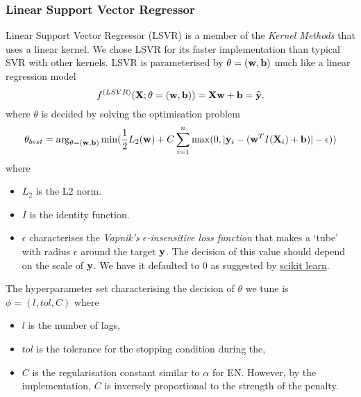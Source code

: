 \subsubsection{Linear Support Vector Regressor}
Linear Support Vector Regressor (LSVR) is a member of the \textit{Kernel Methods} that uses a linear kernel. We chose LSVR for its faster implementation than typical SVR with other kernels. LSVR is parameterised by $\theta = (\mathbf{w}, \mathbf{b})$ much like a linear regression model
\begin{equation*}
    f^{(LSVR)} (\mathbf{X} ; \theta = (\mathbf{w}, \mathbf{b})) = \mathbf{X} \mathbf{w} + \mathbf{b} = \widehat{\mathbf{y}}.
\end{equation*}
where $\theta$ is decided by solving the optimisation problem
\begin{equation*}
    \theta_{best} = \arg_{\theta = (\mathbf{w}, \mathbf{b})} \min (\frac{1}{2} L_2(\mathbf{w}) + C \sum_{i=1}^{n} \max(0, |\mathbf{y}_i - (\mathbf{w}^T I(\mathbf{X}_i) + \mathbf{b})| - \epsilon))
\end{equation*}
where
\begin{itemize}
    \item $L_2$ is the L2 norm.
    \item $I$ is the identity function.
    \item $\epsilon$ characterises the \textit{Vapnik's $\epsilon$-insensitive loss function} that makes a `tube' with radius $\epsilon$ around the target $\mathbf{y}$. The decision of this value should depend on the scale of $\mathbf{y}$. We have it defaulted to $0$ as suggested by \href{https://scikit-learn.org/stable/modules/generated/sklearn.svm.LinearSVR.html#sklearn.svm.LinearSVR}{scikit learn}.
\end{itemize}
The hyperparameter set characterising the decision of $\theta$ we tune is $\phi = (l, tol, C)$ where
\begin{itemize}
    \item $l$ is the number of lags,
    \item $tol$ is the tolerance for the stopping condition during the,
    \item $C$ is the regularisation constant similar to $\alpha$ for EN. However, by the implementation, $C$ is inversely proportional to the strength of the penalty.
\end{itemize}

